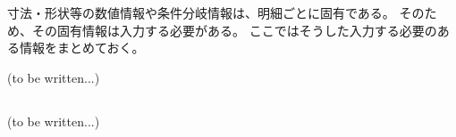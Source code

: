 

寸法・形状等の数値情報や条件分岐情報は、明細ごとに固有である。
そのため、その固有情報は入力する必要がある。
ここではそうした入力する必要のある情報をまとめておく。


\modHeadsection{\TBW}
(to be written...)


\subsection{\TBW}
(to be written...)
